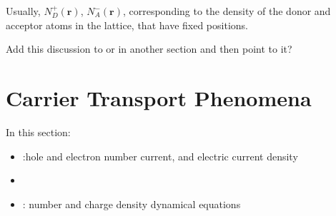 \documentclass[letterpaper,10pt,english]{jupyterBook}
\begin{document}
\sphinxAtStartPar
Usually, \(N_D^+(\mathbf{r})\), \(N_A^-(\mathbf{r})\), corresponding to the density of the donor and acceptor atoms in the lattice, that have fixed positions.

\sphinxAtStartPar
{}   Add this discussion to {\hyperref[\detokenize{ch/solid-state/semiconductors-equilibrium:semiconductors-equilibrium-structure-doped-full-ionization}]{}} or in another section and then point to it?

\sphinxstepscope


\section{Carrier Transport Phenomena}
\label{\detokenize{ch/solid-state/semiconductors-transport-phenomena:carrier-transport-phenomena}}\label{\detokenize{ch/solid-state/semiconductors-transport-phenomena:semiconductors-transport-phenomena}}\label{\detokenize{ch/solid-state/semiconductors-transport-phenomena::doc}}
\sphinxAtStartPar
In this section:
\begin{itemize}
\item {} 
\sphinxAtStartPar
{\hyperref[\detokenize{ch/solid-state/semiconductors-transport-phenomena:semiconductors-transport-phenomena-currents}]{}}:hole and electron number current, and electric current density

\item {} 
\sphinxAtStartPar
{\hyperref[\detokenize{ch/solid-state/semiconductors-transport-phenomena:semiconductors-transport-phenomena-einstein-relation}]{}}

\item {} 
\sphinxAtStartPar
{\hyperref[\detokenize{ch/solid-state/semiconductors-transport-phenomena:semiconductors-transport-phenomena-equations}]{}}: number and charge density dynamical equations

\end{itemize}
\end{document}

